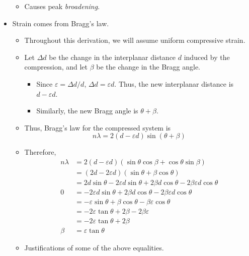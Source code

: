 \documentclass[../notes.tex]{subfiles}
\begin{document}
\begin{itemize}
\begin{equation*}
    \end{equation*}
    \begin{itemize}
        \item Causes peak \emph{broadening}.
    \end{itemize}
    \item Strain comes from Bragg's law.
    \begin{itemize}
        \item Throughout this derivation, we will assume uniform compressive strain.
        \item Let $\Delta d$ be the change in the interplanar distance $d$ induced by the compression, and let $\beta$ be the change in the Bragg angle.
        \begin{itemize}
            \item Since $\varepsilon=\Delta d/d$, $\Delta d=\varepsilon d$. Thus, the new interplanar distance is $d-\varepsilon d$.
            \item Similarly, the new Bragg angle is $\theta+\beta$.
        \end{itemize}
        \item Thus, Bragg's law for the compressed system is
        \begin{equation*}
            n\lambda = 2(d-\varepsilon d)\sin(\theta+\beta)
        \end{equation*}
        \item Therefore,
        \begin{align*}
            n\lambda &= 2(d-\varepsilon d)(\sin\theta\cos\beta+\cos\theta\sin\beta)\\
            &= (2d-2\varepsilon d)(\sin\theta+\beta\cos\theta)\\
            &= 2d\sin\theta-2\varepsilon d\sin\theta+2\beta d\cos\theta-2\beta\varepsilon d\cos\theta\\
            0 &= -2\varepsilon d\sin\theta+2\beta d\cos\theta-2\beta\varepsilon d\cos\theta\\
            &= -\varepsilon\sin\theta+\beta\cos\theta-\beta\varepsilon\cos\theta\\
            &= -2\varepsilon\tan\theta+2\beta-2\beta\varepsilon\\
            &= -2\varepsilon\tan\theta+2\beta\\
            \beta &= \varepsilon\tan\theta
        \end{align*}
        \item Justifications of some of the above equalities.
        \begin{itemize}

\end{itemize}
\end{itemize}
\end{itemize}
\end{document}
